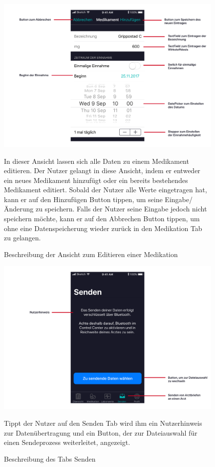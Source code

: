 \documentclass[a4paper]{scrreprt}
\begin{document}
\begin{figure}
\includegraphics[width=1\textwidth]{graphics/UIDescriptions/DetailedMedicationDesc}
\caption{Beschreibung der Ansicht zum Editieren einer Medikation}
\vspace{0.5cm}
In dieser Ansicht lassen sich alle Daten zu einem Medikament editieren. Der Nutzer gelangt in diese Ansicht, indem er entweder ein neues Medikament hinzufügt oder ein bereits bestehendes Medikament editiert. Sobald der Nutzer alle Werte eingetragen hat, kann er auf den \dq Hinzufügen\dq{} Button tippen, um seine Eingabe/Änderung zu speichern. Falls der Nutzer seine Eingabe jedoch nicht speichern möchte, kann er auf den \dq Abbrechen\dq{} Button tippen, um ohne eine Datenspeicherung wieder zurück in den \dq Medikation\dq{} Tab zu gelangen.
\end{figure}

\begin{figure}
\includegraphics[width=1\textwidth]{graphics/UIDescriptions/SendDataDesc}
\caption{Beschreibung des Tabs \dq Senden\dq{}}
\vspace{0.5cm}
Tippt der Nutzer auf den \dq Senden\dq{} Tab wird ihm ein Nutzerhinweis zur Datenübertragung und ein Button, der zur Dateiauswahl für einen Sendeprozess weiterleitet, angezeigt.
\end{figure}
\end{document}
